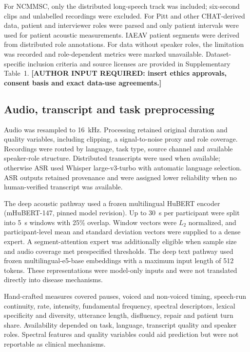 \documentclass[pdflatex,sn-nature]{sn-jnl}
\begin{document}
For NCMMSC, only the distributed long-speech track was included; six-second clips and unlabelled recordings were excluded. For Pitt and other CHAT-derived data, patient and interviewer roles were parsed and only patient intervals were used for patient acoustic measurements. IAEAV patient segments were derived from distributed role annotations. For data without speaker roles, the limitation was recorded and role-dependent metrics were marked unavailable. Dataset-specific inclusion criteria and source licenses are provided in Supplementary Table~1. \textbf{[AUTHOR INPUT REQUIRED: insert ethics approvals, consent basis and exact data-use agreements.]}

\subsection{Audio, transcript and task preprocessing}

Audio was resampled to 16~kHz. Processing retained original duration and quality variables, including clipping, a signal-to-noise proxy and role coverage. Recordings were routed by language, task type, source channel and available speaker-role structure. Distributed transcripts were used when available; otherwise ASR used Whisper large-v3-turbo with automatic language selection. ASR outputs retained provenance and were assigned lower reliability when no human-verified transcript was available.

The deep acoustic pathway used a frozen multilingual HuBERT encoder (mHuBERT-147, pinned model revision). Up to 30~s per participant were split into 5~s windows with 25\% overlap. Window vectors were $L_2$ normalized, and participant-level mean and standard deviation vectors were supplied to a dense expert. A segment-attention expert was additionally eligible when sample size and audio coverage met prespecified thresholds. The deep text pathway used frozen multilingual-e5-base embeddings with a maximum input length of 512 tokens. These representations were model-only inputs and were not translated directly into disease mechanisms.

Hand-crafted measures covered pauses, voiced and non-voiced timing, speech-run continuity, rate, intensity, fundamental frequency, spectral descriptors, lexical specificity and diversity, utterance length, disfluency, repair and patient turn share. Availability depended on task, language, transcript quality and speaker roles. Spectral features and quality variables could aid prediction but were not reportable as clinical mechanisms.
\end{document}
